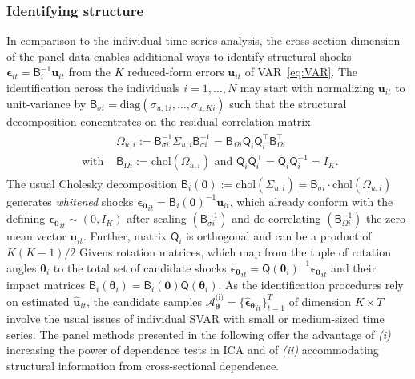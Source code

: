 \subsubsection{Identifying structure}
In comparison to the individual time series analysis, the cross-section dimension of the panel data enables additional ways to identify structural shocks $ \boldsymbol{\epsilon}_{it} = \mathsf{B}_i^{-1} \boldsymbol{u}_{it} $ from the $ K $ reduced-form errors $ \boldsymbol{u}_{it} $ of VAR~\eqref{eq:VAR}. The identification across the individuals $ i=1,\ldots,N $ may start with normalizing $ \boldsymbol{u}_{it} $ to unit-variance by $ \textsf{B}_{\sigma i} = \text{diag}\left( \sigma_{u,1i}, \ldots, \sigma_{u,Ki} \right) $ such that the structural decomposition concentrates on the residual correlation matrix
\begin{align}
\begin{split}
	&\Omega_{u,i} := \textsf{B}_{\sigma i}^{-1} \Sigma^{\ }_{u,i} \textsf{B}_{\sigma i}^{-1} = \textsf{B}_{\Omega i}^{\ } \mathsf{Q}_i^{\ } \mathsf{Q}_i^\top \textsf{B}_{\Omega i}^\top \\
	\text{ with } & \textsf{B}_{\Omega i} := \text{chol}\left( \Omega_{u,i} \right) \text{ and } \mathsf{Q}_i^{\ } \mathsf{Q}_i^\top = \mathsf{Q}_i^{\ } \mathsf{Q}_i^{-1} = I_K.
\end{split}
\end{align}
The usual Cholesky decomposition $ \textsf{B}_{i} \left( \boldsymbol{0} \right) := \text{chol}\left( \Sigma_{u,i} \right) = \textsf{B}_{\sigma i} \cdot \text{chol}\left( \Omega_{u,i} \right) $ generates \textit{whitened} shocks $ \boldsymbol{\epsilon_0}_{it} = \mathsf{B}_i \left( \boldsymbol{0} \right)^{-1} \boldsymbol{u}_{it} $, which already conform with the defining $ \boldsymbol{\epsilon_0}_{it} \sim ( 0, I_K ) $ after scaling $ \left( \textsf{B}_{\sigma i}^{-1} \right) $ and de-correlating $ \left( \textsf{B}_{\Omega i}^{-1} \right) $ the zero-mean vector $ \boldsymbol{u}_{it} $. Further, matrix $ \mathsf{Q}_i $ is orthogonal and can be a product of $ K(K-1)/2 $ Givens rotation matrices, which map from the tuple of rotation angles $ \boldsymbol{\theta}_i $ to the total set of candidate shocks $ \boldsymbol{\epsilon_\theta}_{it} = \mathsf{Q} \left( \boldsymbol{\theta}_i \right)^{-1} \boldsymbol{\epsilon_0}_{it} $ and their impact matrices $ \mathsf{B}_i \left( \boldsymbol{\theta}_i \right) = \textsf{B}_{i} \left( \boldsymbol{0} \right) \mathsf{Q} \left( \boldsymbol{\theta}_i \right) $. As the identification procedures rely on estimated $ \boldsymbol{\widehat{u}}_{it} $, the candidate samples $ \mathcal{A}_{\boldsymbol{\theta}}^{\text{(i)}} = \{ \boldsymbol{\widehat{\epsilon}_\theta}_{it} \}^T_{t=1} $ of dimension $ K \times T $ involve the usual issues of individual SVAR with small or medium-sized time series. The panel methods presented in the following offer the advantage of \textit{(i)} increasing the power of dependence tests in ICA and of \textit{(ii)} accommodating structural information from cross-sectional dependence.
